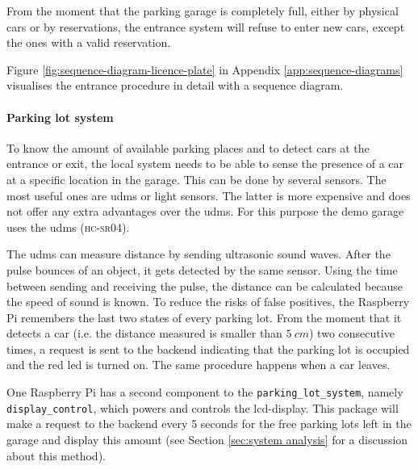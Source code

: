 \ind From the moment that the parking garage is completely full, either by physical cars or by reservations, the entrance system will refuse to enter new cars, except the ones with a valid reservation.

\ind Figure \ref{fig:sequence-diagram-licence-plate} in Appendix \ref{app:sequence-diagrams} visualises the entrance procedure in detail with a sequence diagram.

\paragraph{Parking lot system}
To know the amount of available parking places and to detect cars at the entrance or exit, the local system needs to be able to sense the presence of a car at a specific location in the garage. This can be done by several sensors. The most useful ones are \ac{udms} or light sensors. The latter is more expensive and does not offer any extra advantages over the \ac{udms}. For this purpose the demo garage uses the \ac{udms} (\textsc{hc-sr04}).

\ind The \ac{udms} can measure distance by sending ultrasonic sound waves. After the pulse bounces of an object, it gets detected by the same sensor. Using the time between sending and receiving the pulse, the distance can be calculated because the speed of sound is known. To reduce the risks of false positives, the Raspberry Pi remembers the last two states of every parking lot. From the moment that it detects a car (i.e. the distance measured is smaller than $5 \ \unit{cm}$) two consecutive times, a request is sent to the backend indicating that the parking lot is occupied and the red \ac{led} is turned on. The same procedure happens when a car leaves. 

\ind One Raspberry Pi has a second component to the \verb|parking_lot_system|, namely \verb|display_control|, which powers and controls the \ac{lcd}-display. This package will make a request to the backend every 5 seconds for the free parking lots left in the garage and display this amount (see Section \ref{sec:system analysis} for a discussion about this method).

